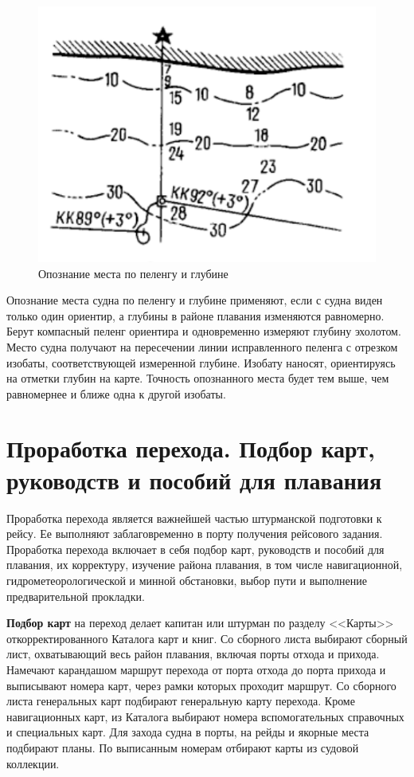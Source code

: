 \documentclass[a4paper, 12pt, twoside, final, book, russian, fittopage, cyremdash]{ncc}
\begin{document}
\begin{figure}[htb]
  \centering{}
  \includegraphics{N051}
  \caption{Опознание места по пеленгу и глубине}
  \label{fig:N51}
\end{figure} 

Опознание места судна по пеленгу и глубине применяют, если с судна виден только один ориентир, а глубины в районе плавания изменяются равномерно. Берут компасный пеленг ориентира и одновременно измеряют глубину эхолотом. Место судна получают на пересечении линии исправленного пеленга с отрезком изобаты, соответствующей измеренной глубине. Изобату наносят, ориентируясь на отметки глубин на карте. Точность опознанного места будет тем выше, чем равномернее и ближе одна к другой изобаты.

\section{Проработка перехода. Подбор карт, руководств и пособий для плавания}

Проработка перехода является важнейшей частью штурманской подготовки к рейсу. Ее выполняют заблаговременно в порту получения рейсового задания. Проработка перехода включает в себя подбор карт, руководств и пособий для плавания, их корректуру, изучение района плавания, в том числе навигационной, гидрометеорологической и минной обстановки, выбор пути и выполнение предварительной прокладки. 

\textbf{Подбор карт} на переход делает капитан или штурман по разделу <<Карты>> откорректированного Каталога карт и книг. Со сборного листа выбирают сборный лист, охватывающий весь район плавания, включая порты отхода и прихода. Намечают карандашом маршрут перехода от порта отхода до порта прихода и выписывают номера карт, через рамки которых проходит маршрут. Со сборного листа генеральных карт подбирают генеральную карту перехода. Кроме навигационных карт, из Каталога выбирают номера вспомогательных справочных и специальных карт. Для захода судна в порты, на рейды и якорные места подбирают планы. По выписанным номерам отбирают карты из судовой коллекции. 
\end{document}
